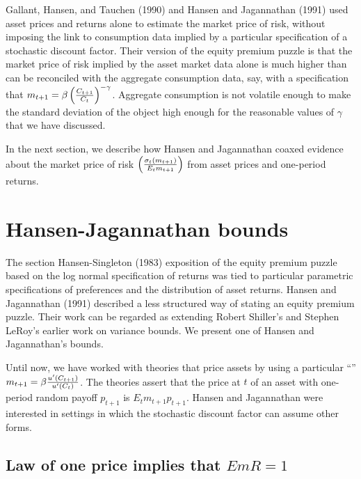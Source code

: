     Gallant, Hansen, and Tauchen (1990) and Hansen and
Jagannathan (1991) used asset prices and  returns alone
to estimate the market price of risk, without
imposing the link to consumption data implied by a
particular specification of a stochastic discount factor.
Their version of the equity premium puzzle is that
the market price of risk implied by the asset market data alone
is much higher than can be reconciled with the aggregate
consumption data, say, with
a specification that
$ m_{t+1} = \beta \left( {C_{t+1} \over C_t }\right)^{-\gamma}$.
Aggregate consumption is not volatile enough to make the
standard deviation of the object  high enough for the reasonable
values of $\gamma$ that we have  discussed.

  In the next section, we describe how Hansen and Jagannathan
coaxed evidence about the market price of risk $\left({\sigma_t (m_{t+1}) \over E_t m_{t+1} }\right)$ from
asset prices and one-period returns.


\section{Hansen-Jagannathan bounds}\label{sec:HJbounds}%
   The section  Hansen-Singleton (1983) exposition of the equity premium
puzzle based on the log normal specification
of returns  was
 tied to  particular parametric specifications of preferences
and the distribution of  asset returns.
Hansen and Jagannathan (1991)  described
a less structured   way of stating an equity premium puzzle.
Their work can be regarded as  extending  Robert Shiller's and
Stephen LeRoy's earlier work on  variance bounds.
We present one of Hansen and Jagannathan's bounds.


Until now, we have worked with theories that
price assets by using a particular ``''
 $m_{t+1} = \beta {u'(C_{t+1}) \over u'(C_t)}$.  The  theories
assert that the price at $t$ of  an asset with one-period random payoff $p_{t+1}$
is $E_t m_{t+1} p_{t+1}$.  Hansen and Jagannathan were interested in settings
in which the stochastic discount factor can assume
other forms.


\subsection{Law of one price implies that $E m R =1$}

